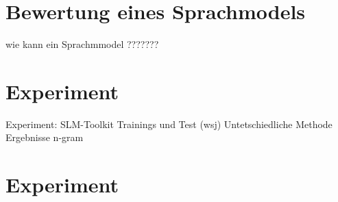\chapter{Bewertung eines Sprachmodels}
\label{chapter:bewertung_sprachmodel}
wie kann ein Sprachmmodel ???????

\chapter{Experiment}
\label{chapter:Experiment}

	Experiment:
		SLM-Toolkit
		Trainings und Test (wsj)
		Untetschiedliche Methode
		Ergebnisse
		   n-gram
		   
\chapter{Experiment}
\label{chapter:Experiment}
 